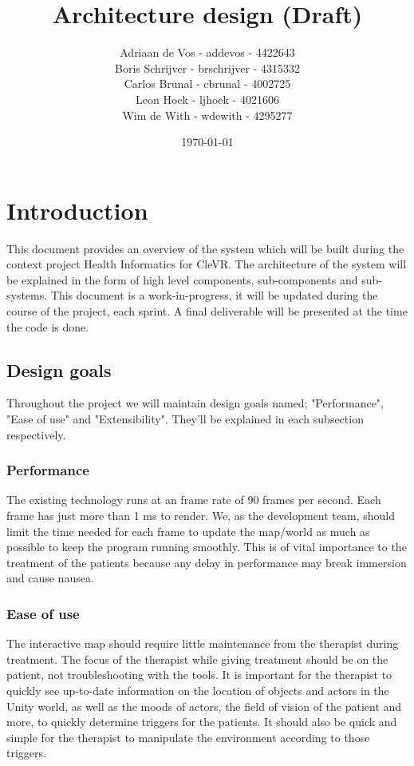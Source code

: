 \documentclass[11pt]{article}
\begin{document}
\title{Architecture design (Draft)}
\author{
	Adriaan de Vos - addevos - 4422643\\
	Boris Schrijver - brschrijver - 4315332\\
	Carlos Brunal - cbrunal - 4002725\\
	Leon Hoek - ljhoek - 4021606\\
	Wim de With - wdewith - 4295277
}
\date{\today}

\maketitle

\newpage
\tableofcontents
\newpage

\section{Introduction}
This document provides an overview of the system which will be built during the context project Health
Informatics for \gls{CleVR}. The architecture of the system will be explained in the form of high level components, sub-components and sub-systems. This document is a work-in-progress, it will be updated during the course of the project, each sprint. A final deliverable will be presented at the time the code is done.

    \subsection{Design goals}
    Throughout the project we will maintain design goals named; "Performance", "Ease of use" and "Extensibility". They'll be explained in each subsection respectively.

        \subsubsection{Performance}
        The existing technology runs at an frame rate of 90 frames per second. Each frame has just more than 1 ms to render. We, as the development team, should limit the time needed for each frame to update the map/world as much as possible to keep the program running smoothly. This is of vital importance to the treatment of the patients because any delay in performance may break immersion and cause nausea.
        
        \subsubsection{Ease of use}
       The interactive map should require little maintenance from the therapist during treatment. The focus of the therapist while giving treatment should be on the patient, not troubleshooting with the tools.
    It is important for the therapist to quickly see up-to-date information on the location of objects and actors in the \gls{Unity} world, as well as the moods of actors, the field of vision of the patient and more, to quickly determine triggers for the patients. It should also be quick and simple for the therapist to manipulate the environment according to those triggers. 
            
\end{document}
